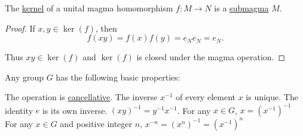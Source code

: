 \begin{proposition}\label{thm:unital_magma_kernel_is_submagma}
  The \hyperref[def:unital_magma_kernel]{kernel} of a unital magma homomorphism \( f: M \to N \) is a \hyperref[def:first_order_substructure]{submagma} \( M \).
\end{proposition}
\begin{proof}
  If \( x, y \in \ker(f) \), then
  \begin{equation*}
    f(xy) = f(x) f(y) = e_N e_N = e_N.
  \end{equation*}

  Thus \( xy \in \ker(f) \) and \( \ker(f) \) is closed under the magma operation.
\end{proof}

\begin{proposition}\label{thm:group_properties}
  Any group \( G \) has the following basic properties:
  \begin{propenum}
     The operation is \hyperref[def:algebraic_theory/cancellative]{cancellative}.
     The inverse \( x^{-1} \) of every element \( x \) is unique.
     The identity \( e \) is its own inverse.
     \( (xy)^{-1} = y^{-1} x^{-1} \).
     For any \( x \in G \), \( x = (x^{-1})^{-1} \)
     For any \( x \in G \) and positive integer \( n \), \( x^{-n} = (x^n)^{-1} = (x^{-1})^n \)
  \end{propenum}
\end{proposition}
